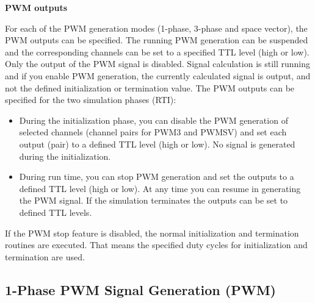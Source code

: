 \noindent \textbf{PWM outputs}\par
For each of the PWM generation modes (1-phase, 3-phase and space vector), the PWM outputs can be specified. The running PWM generation can be suspended and the corresponding channels can be set to a specified TTL level (high or low). Only the output of the PWM signal is disabled. Signal calculation is still running and if you enable PWM generation, the currently calculated signal is output, and not the defined initialization or termination value. The PWM outputs can be specified for the two simulation phases (RTI):
\begin{itemize}
    \item During the initialization phase, you can disable the PWM generation of selected channels (channel pairs for PWM3 and PWMSV) and set each output (pair) to a defined TTL level (high or low). No signal is generated during the initialization.
    \item During run time, you can stop PWM generation and set the outputs to a defined TTL level (high or low). At any time you can resume in generating the PWM signal. If the simulation terminates the outputs can be set to defined TTL levels.
\end{itemize}

If the PWM stop feature is disabled, the normal initialization and termination routines are executed. That means the specified duty cycles for initialization and termination are used.

\subsection{1-Phase PWM Signal Generation (PWM)}

